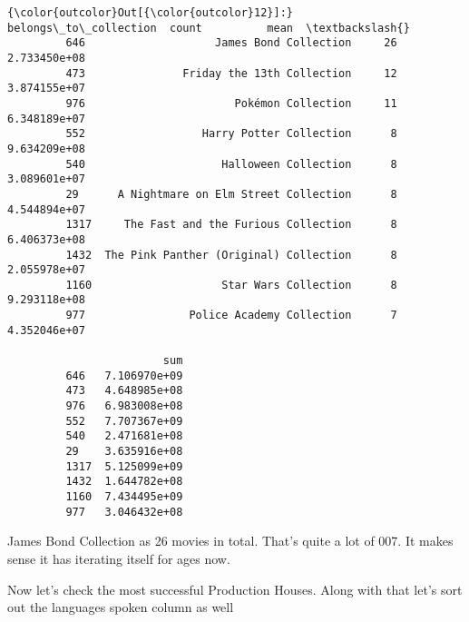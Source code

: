 \documentclass[11pt]{article}
\begin{document}
\begin{Verbatim}[commandchars=\\\{\}]
{\color{outcolor}Out[{\color{outcolor}12}]:}                        belongs\_to\_collection  count          mean  \textbackslash{}
         646                    James Bond Collection     26  2.733450e+08   
         473               Friday the 13th Collection     12  3.874155e+07   
         976                       Pokémon Collection     11  6.348189e+07   
         552                  Harry Potter Collection      8  9.634209e+08   
         540                     Halloween Collection      8  3.089601e+07   
         29      A Nightmare on Elm Street Collection      8  4.544894e+07   
         1317     The Fast and the Furious Collection      8  6.406373e+08   
         1432  The Pink Panther (Original) Collection      8  2.055978e+07   
         1160                    Star Wars Collection      8  9.293118e+08   
         977                Police Academy Collection      7  4.352046e+07   
         
                        sum  
         646   7.106970e+09  
         473   4.648985e+08  
         976   6.983008e+08  
         552   7.707367e+09  
         540   2.471681e+08  
         29    3.635916e+08  
         1317  5.125099e+09  
         1432  1.644782e+08  
         1160  7.434495e+09  
         977   3.046432e+08  
\end{Verbatim}
            
    James Bond Collection as 26 movies in total. That's quite a lot of 007.
It makes sense it has iterating itself for ages now.

    Now let's check the most successful Production Houses. Along with that
let's sort out the languages spoken column as well
\end{document}

